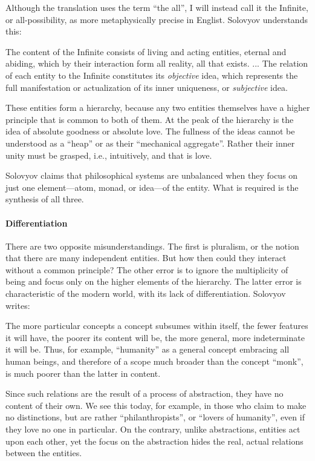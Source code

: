 Although the translation uses the term ``the all'', I will instead call it the Infinite, or all-possibility, as more metaphysically precise in Englist. Solovyov understands this:

\begin{quotex}
The content of the Infinite consists of living and acting entities, eternal and abiding, which by their interaction form all reality, all that exists. ... The relation of each entity to the Infinite constitutes its \emph{objective} idea, which represents the full manifestation or actualization of its inner uniqueness, or \emph{subjective} idea.
\end{quotex}


These entities form a hierarchy, because any two entities themselves have a higher principle that is common to both of them. At the peak of the hierarchy is the idea of absolute goodness or absolute love. The fullness of the ideas cannot be understood as a ``heap'' or as their ``mechanical aggregate''. Rather their inner unity must be grasped, i.e., intuitively, and that is love.

Solovyov claims that philosophical systems are unbalanced when they focus on just one element---atom, monad, or idea---of the entity. What is required is the synthesis of all three.

\paragraph{Differentiation}


There are two opposite misunderstandings. The first is pluralism, or the notion that there are many independent entities. But how then could they interact without a common principle? The other error is to ignore the multiplicity of being and focus only on the higher elements of the hierarchy. The latter error is characteristic of the modern world, with its lack of differentiation. Solovyov writes:

\begin{quotex}
The more particular concepts a concept subsumes within itself, the fewer features it will have, the poorer its content will be, the more general, more indeterminate it will be. Thus, for example, ``humanity'' as a general concept embracing all human beings, and therefore of a scope much broader than the concept ``monk'', is much poorer than the latter in content.
\end{quotex}


Since such relations are the result of a process of abstraction, they have no content of their own. We see this today, for example, in those who claim to make no distinctions, but are rather ``philanthropists'', or ``lovers of humanity'', even if they love no one in particular. On the contrary, unlike abstractions, entities act upon each other, yet the focus on the abstraction hides the real, actual relations between the entities.

